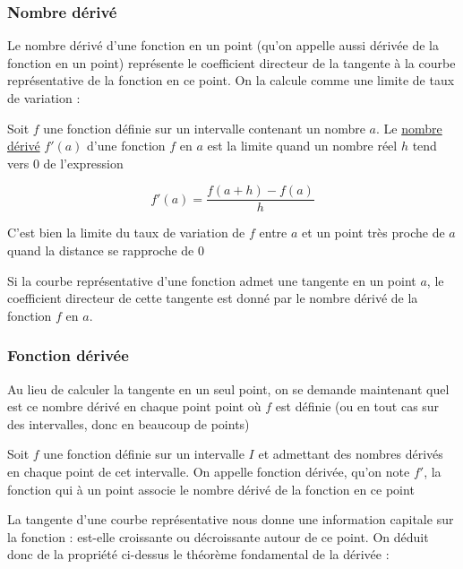 \documentclass[10pt,a4paper]{book}
\begin{document}
\subsubsection{Nombre dérivé}

Le nombre dérivé d'une fonction en un point (qu'on appelle aussi dérivée de la fonction en un point) représente le coefficient directeur de la tangente à la courbe représentative de la fonction en ce point. 
On la calcule comme une limite de taux de variation :

\begin{de}
    Soit $f$ une fonction définie sur un intervalle contenant un nombre $a$. Le \underline{nombre dérivé} $f'(a)$ d'une fonction $f$ en $a$ est la limite quand un nombre réel $h$ tend vers 0 de l'expression 

    \[f'(a)=\frac{f(a+h)-f(a)}{h}\]

\end{de}

C'est bien la limite du taux de variation de $f$ entre $a$ et un point très proche de $a$ quand la distance se rapproche de $0$

\begin{prop}
    Si la courbe représentative d'une fonction admet une tangente en un point $a$, le coefficient directeur de cette tangente est donné par le nombre dérivé de la fonction $f$ en $a$.
\end{prop}

\subsubsection{Fonction dérivée}

Au lieu de calculer la tangente en un seul point, on se demande maintenant quel est ce nombre dérivé en chaque point point où $f$ est définie (ou en tout cas sur des intervalles, donc en beaucoup de points)

\begin{de}
    Soit $f$ une fonction définie sur un intervalle $I$ et admettant des nombres dérivés en chaque point de cet intervalle. On appelle fonction dérivée, qu'on note $f'$, la fonction qui à un point associe le nombre dérivé de la fonction en ce point
\end{de}


La tangente d'une courbe représentative nous donne une information capitale sur la fonction : est-elle croissante ou décroissante autour de ce point. On déduit donc de la propriété ci-dessus le théorème fondamental de la dérivée :
\end{document}
